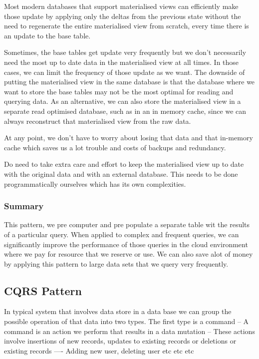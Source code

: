Most modern databases that support materialised views can efficiently make those update by applying only the deltas from the previous state without the need to regenerate the entire materialised view from scratch, every time there is an update to the base table.

Sometimes, the base tables get update very frequently but we don't necessarily need the most up to date data in the materialised view at all times.
In those cases, we can limit the frequency of those update as we want.
The downside of putting the materialised view in the same database is that the database where we want to store the base tables may not be the most optimal for reading and querying data.
As an alternative, we can also store the materialised view in a separate read optimised database, such as in an in memory cache, since we can always reconstruct that materialised view from the raw data.

At any point, we don't have to worry about losing that data and that in-memory cache which saves us a lot trouble and costs of backups and redundancy.

Do need to take extra care and effort to keep the materialised view up to date with the original data and with an external database.
This needs to be done programmatically ourselves which has its own complexities.

\subsubsection{Summary}
This pattern, we pre computer and pre populate a separate table wit the results of a particular query.
When applied to complex and frequent queries, we can significantly improve the performance of those queries in the cloud environment where we pay for resource that we reserve or use.
We can also save alot of money by applying this pattern to large data sets that we query very frequently.

\subsection{CQRS Pattern}
In typical system that involves data store in a data base we can group the possible operation of that data into two types.
The first type is a command
-- A command is an action we perform that results in a data mutation
-- These actions involve insertions of new records, updates to existing records or deletions or existing records
---- Adding new user, deleting user etc etc etc

